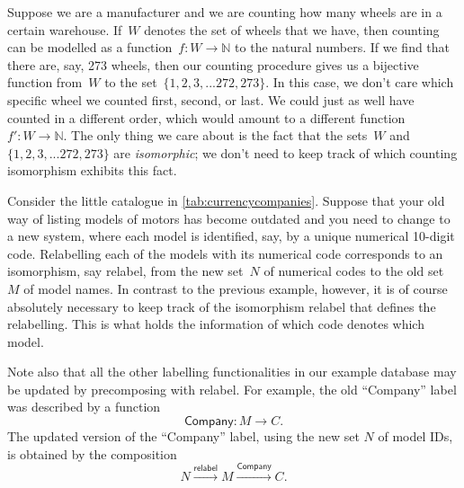 \begin{example}[Sizes]
Suppose we are a manufacturer and we are counting how many wheels are in a certain warehouse. If~$W$ denotes the set of wheels that we have, then counting can be modelled as a function~$f\colon W \to \mathbb{N}$ to the natural numbers. If we find that there are, say, 273 wheels, then our counting procedure gives us a bijective function from~$W$ to the set~$\{1, 2, 3,... 272, 273 \}$. In this case, we don't care which specific wheel we counted first, second, or last. We could just as well have counted in a different order, which would amount to a different function~$f'\colon W \to \mathbb{N}$. The only thing we care about is the fact that the sets~$W$ and~$\{1, 2, 3,... 272, 273 \}$ are \emph{isomorphic}; we don't need to keep track of which counting isomorphism exhibits this fact.
\end{example}


\begin{example}[Relabelling]
Consider the little catalogue in \cref{tab:currencycompanies}. Suppose that your old way of listing models of motors has become outdated and you need to change to a new system, where each model is identified, say, by a unique numerical 10-digit code. Relabelling each of the models with its numerical code corresponds to an isomorphism, say \textsf{relabel}, from the new set~$N$ of numerical codes to the old set~$M$ of model names. In contrast to the previous example, however, it is of course absolutely necessary to keep track of the isomorphism \textsf{relabel} that defines the relabelling. This is what holds the information of which code denotes which model.

Note also that all the other labelling functionalities in our example database may be updated by precomposing with \textsf{relabel}. For example, the old ``Company'' label was described by a function
\begin{equation*}
\textsf{Company}\colon M \to C.
\end{equation*}
The updated version of the ``Company'' label, using the new set $N$ of model IDs, is obtained by the composition
\begin{equation*}
N \overset{\textsf{relabel}}{\longrightarrow} M \overset{\textsf{Company}}{\longrightarrow} C.
\end{equation*}
\end{example}




